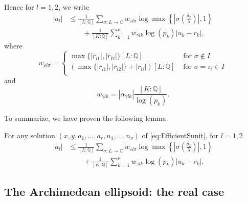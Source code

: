 Hence for $l = 1,2$, we write
\begin{align} \label{eq:albound}
|a_l|	&\leq \frac{1}{[L:\mathbb{Q}]}\sum_{\sigma :L \to \mathbb{C}} w_{\varepsilon l \sigma}\log \max \left\{ \left|\sigma\left(\frac{\delta_2}{\lambda}\right)\right|, 1\right\} \\
	&\quad\quad+ \frac{1}{[K:\mathbb{Q}]}\sum_{k = 1}^{\nu} w_{\gamma l k}\log(p_k)|u_k - r_k|,
\end{align}
where
\begin{equation} \label{eq:welsigma}
w_{\varepsilon l \sigma} = 
\begin{cases}
\max\{|\overline{r}_{l1}|, |\overline{r}_{l2}|\}[L:\mathbb{Q}] & \text{ for } \sigma \notin I\\
\left(\max\{|\overline{r}_{l1}|, |\overline{r}_{l2}|\} + |\overline{r}_{li}|\right)[L:\mathbb{Q}] & \text{ for } \sigma = \iota_i \in I\\
\end{cases}
\end{equation}
and 
\begin{equation} \label{eq:wgammalk}
w_{\gamma l k} = |\alpha_{\gamma l k}|\frac{[K:\mathbb{Q}]}{\log(p_k)}.
\end{equation}

To summarize, we have proven the following lemma.
\begin{lemma}\label{lem:mepsbound}
For any solution $(x,y,a_1, \dots, a_r, n_1, \dots, n_{\nu})$ of \eqref{eq:EfficientSunit}, for $l =1,2$
\begin{align*}
|a_l| &\leq \frac{1}{[L:\mathbb{Q}]}\sum_{\sigma :L \to \mathbb{C}} w_{\varepsilon l \sigma}\log \max \left\{ \left|\sigma\left(\frac{\delta_2}{\lambda}\right)\right|, 1\right\} \\
	& \quad \quad+ \frac{1}{[K:\mathbb{Q}]}\sum_{k = 1}^{\nu} w_{\gamma l k}\log(p_k)|u_k - r_k|.
\end{align*}
\end{lemma}


\subsection{The Archimedean ellipsoid: the real case}
\label{subsec:ArchEllipsoid}

